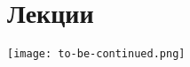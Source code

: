 \documentclass[a4paper,12pt]{book}
\begin{document}
    \pagestyle{empty}
    \titlepage
    \tableofcontents
    
    \chapter{Лекции}
    \pagestyle{fancy}
    
    
    
    
    
    
    
    
    
    \begin{flushright}
    	\texttt{[image: to-be-continued.png]}
    \end{flushright}
\end{document}
